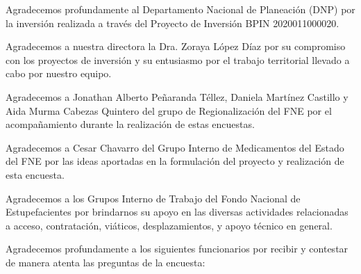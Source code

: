 \documentclass[
  oneside]{book}
\begin{document}
Agradecemos profundamente al Departamento Nacional de Planeación (DNP) por la inversión realizada a través del Proyecto de Inversión BPIN 2020011000020.

Agradecemos a nuestra directora la Dra. Zoraya López Díaz por su compromiso con los proyectos de inversión y su entusiasmo por el trabajo territorial llevado a cabo por nuestro equipo.

Agradecemos a Jonathan Alberto Peñaranda Téllez, Daniela Martínez Castillo y Aida Murma Cabezas Quintero del grupo de Regionalización del FNE por el acompañamiento durante la realización de estas encuestas.

Agradecemos a Cesar Chavarro del Grupo Interno de Medicamentos del Estado del FNE por las ideas aportadas en la formulación del proyecto y realización de esta encuesta.

Agradecemos a los Grupos Interno de Trabajo del Fondo Nacional de Estupefacientes por brindarnos su apoyo en las diversas actividades relacionadas a acceso, contratación, viáticos, desplazamientos, y apoyo técnico en general.

Agradecemos profundamente a los siguientes funcionarios por recibir y contestar de manera atenta las preguntas de la encuesta:
\end{document}
